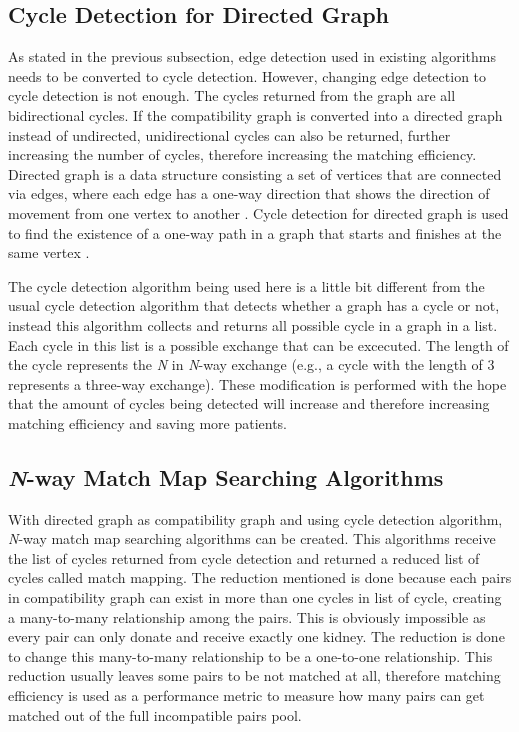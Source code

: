 \documentclass[conference]{IEEEtran}
\begin{document}
\subsection{Cycle Detection for Directed Graph}
As stated in the previous subsection, edge detection used in existing algorithms needs to be converted to cycle detection.
However, changing edge detection to cycle detection is not enough. The cycles returned from the graph are all bidirectional
cycles. If the compatibility graph is converted into a directed graph instead of undirected, unidirectional cycles can also be
returned, further increasing the number of cycles, therefore increasing the matching efficiency.
Directed graph is a data structure consisting a set of vertices that are connected via edges, where each edge has a one-way
direction that shows the direction of movement from one vertex to another \cite{sedgewick}.
Cycle detection for directed graph is used to find the existence of a one-way path in a graph that starts and finishes
at the same vertex \cite{mehta}.

The cycle detection algorithm being used here is a little bit different from the usual cycle detection algorithm that detects
whether a graph has a cycle or not, instead this algorithm collects and returns all possible cycle in a graph in a list.
Each cycle in this list is a possible exchange that can be excecuted. The length of the cycle represents the \textit{N} in
\textit{N}-way exchange (e.g., a cycle with the length of 3 represents a three-way exchange).
These modification is performed with the hope that the amount of cycles being detected will
increase and therefore increasing matching efficiency and saving more patients.

\subsection{\textit{N}-way Match Map Searching Algorithms}
With directed graph as compatibility graph and using cycle detection algorithm, \textit{N}-way match map searching algorithms
can be created. This algorithms receive the list of cycles returned from cycle detection and returned a reduced list of cycles
called match mapping. The reduction mentioned is done because each pairs in compatibility graph can exist in more than one cycles
in list of cycle, creating a many-to-many relationship among the pairs. This is obviously impossible as every pair can only donate
and receive exactly one kidney. The reduction is done to change this many-to-many relationship to be a one-to-one relationship. This
reduction usually leaves some pairs to be not matched at all, therefore matching efficiency is used as a performance metric to
measure how many pairs can get matched out of the full incompatible pairs pool.  
\end{document}
